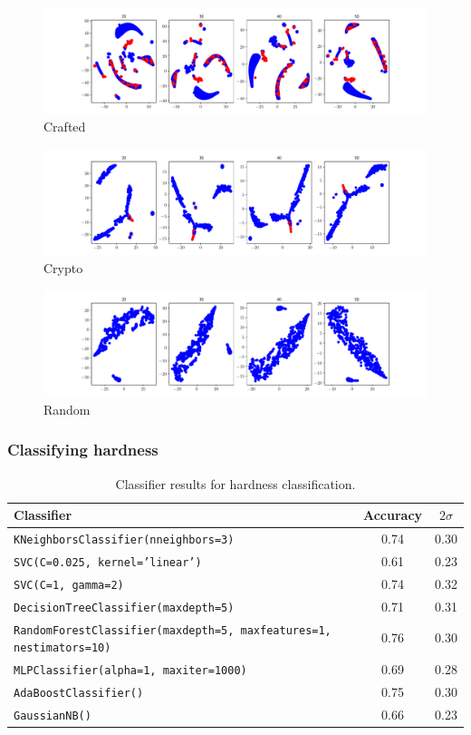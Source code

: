 \documentclass[10pt]{article}
\begin{document}
\begin{figure}[h]
\includegraphics[width=\linewidth]{tSNE/Hardness_Crafted.pdf}
\caption{Crafted}
\end{figure}
\begin{figure}[h]
\includegraphics[width=\linewidth]{tSNE/Hardness_Crypto.pdf}
\caption{Crypto}
\end{figure}
\begin{figure}[h]
    \label{fig:Random}
\includegraphics[width=\linewidth]{tSNE/Hardness_Random.pdf}
\caption{Random}
\end{figure}

\subsubsection{Classifying hardness}
\begin{table}[h]
\begin{center}
\renewcommand{\arraystretch}{1.2}
\begin{tabular}{ l  c  c }
 \label{tab:MNIST}
 Classifier & Accuracy & $2\sigma$ \\
 \hline
  \texttt{KNeighborsClassifier(nneighbors=3)} & 0.74 & 0.30 \\
  \texttt{SVC(C=0.025, kernel='linear')} & 0.61  & 0.23 \\
  \texttt{SVC(C=1, gamma=2)} & 0.74 & 0.32 \\
  \texttt{DecisionTreeClassifier(maxdepth=5)} & 0.71 & 0.31 \\
  \texttt{RandomForestClassifier(maxdepth=5, maxfeatures=1, nestimators=10)} & 0.76 & 0.30 \\
  \texttt{MLPClassifier(alpha=1, maxiter=1000)} & 0.69 & 0.28 \\
  \texttt{AdaBoostClassifier()} & 0.75 & 0.30 \\
  \texttt{GaussianNB()} & 0.66 & 0.23
\end{tabular}
\caption{Classifier results for hardness classification.}
\end{center}
\end{table}
\end{document}

